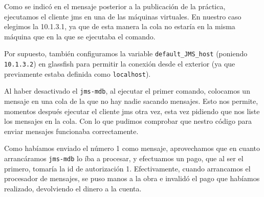 \documentclass[a4paper, 10pt]{article}
\begin{document}
	Como se indicó en el mensaje posterior a la publicación de la práctica, ejecutamos el cliente jms en una de las máquinas virtuales. En nuestro caso elegimos la 10.1.3.1, ya que de esta manera la cola no estaría en la misma máquina que en la que se ejecutaba el comando.

	Por supuesto, también configuramos la variable \texttt{default\_JMS\_host} (poniendo \texttt{10.1.3.2}) en glassfish para permitir la conexión desde el exterior (ya que previamente estaba definida como \texttt{localhost}).


	Al haber desactivado el \texttt{jms-mdb}, al ejecutar el primer comando, colocamos un mensaje en una cola de la que no hay nadie sacando mensajes. Esto nos permite, momentos después ejecutar el cliente jms otra vez, esta vez pidiendo que nos liste los mensajes en la cola. Con lo que pudimos comprobar que nestro código para enviar mensajes funcionaba correctamente.

	Como habíamos enviado el número 1 como mensaje, aprovechamos que en cuanto arrancáramos \texttt{jms-mdb} lo íba a procesar, y efectuamos un pago, que al ser el primero, tomaría la id de autorización 1. Efectivamente, cuando arrancamos el procesador de mensajes, se puso manos a la obra e invalidó el pago que habíamos realizado, devolviendo el dinero a la cuenta.

\vspace{10mm}
	
\end{document}
